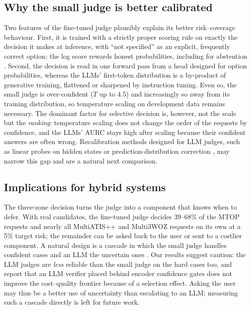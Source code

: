 \subsection{Why the small judge is better calibrated}
\label{sec:calibration-discussion}

Two features of the fine-tuned judge plausibly explain its better risk--coverage behaviour. First, it is trained with a strictly proper scoring rule on exactly the decision it makes at inference, with ``not specified'' as an explicit, frequently correct option; the log score rewards honest probabilities, including for abstention \citep{gneiting2007scoring}. Second, the decision is read in one forward pass from a head designed for option probabilities, whereas the LLMs' first-token distribution is a by-product of generative training, flattened or sharpened by instruction tuning. Even so, the small judge is over-confident ($T$ up to 4.5) and increasingly so away from its training distribution, so temperature scaling on development data remains necessary. The dominant factor for selective decision is, however, not the scale but the \emph{ranking}: temperature scaling does not change the order of the requests by confidence, and the LLMs' AURC stays high after scaling because their confident answers are often wrong. Recalibration methods designed for LLM judges, such as linear probes on hidden states \citep{radharapu2026calibrating} or prediction-distribution correction \citep{li2025calibraeval}, may narrow this gap and are a natural next comparison.

\subsection{Implications for hybrid systems}
\label{sec:hybrid}

The three-zone decision turns the judge into a component that knows when to defer. With real candidates, the fine-tuned judge decides 39--68\% of the MTOP requests and nearly all MultiATIS++ and Multi3WOZ requests on its own at a 5\% target risk; the remainder can be asked back to the user or sent to a costlier component. A natural design is a cascade in which the small judge handles confident cases and an LLM the uncertain ones \citep{lee2024orchestrallm}. Our results suggest caution: the LLM judges are \emph{less} reliable than the small judge on the hard cases too, and \citet{tikhomirov2026selection} report that an LLM verifier placed behind encoder confidence gates does not improve the cost--quality frontier because of a selection effect. Asking the user may thus be a better use of uncertainty than escalating to an LLM; measuring such a cascade directly is left for future work.


